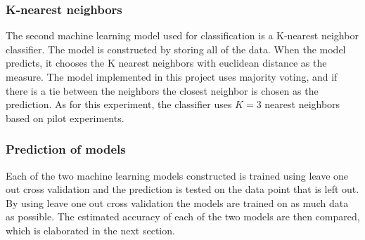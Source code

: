 \documentclass[11pt, fleqn, titlepage]{article}
\begin{document}
\subsubsection*{K-nearest neighbors}  \vspace*{-0.2cm}
The second machine learning model used for classification is a K-nearest neighbor classifier. The model is constructed by storing all of the data. When the model predicts, it chooses the K nearest neighbors with euclidean distance as the measure. The model implemented in this project uses majority voting, and if there is a tie between the neighbors the closest neighbor is chosen as the prediction. As for this experiment, the classifier uses $ K=3 $ nearest neighbors based on pilot experiments.
\vspace*{-0.2cm}
\subsubsection*{Prediction of models}  \vspace*{-0.2cm}
Each of the two machine learning models constructed is trained using leave one out cross validation and the prediction is tested on the data point that is left out. By using leave one out cross validation the models are trained on as much data as possible. The estimated accuracy of each of the two models are then compared, which is elaborated in the next section.
\vspace*{-0.2cm}
\end{document}
